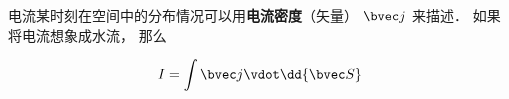 

电流某时刻在空间中的分布情况可以用\textbf{电流密度}（矢量） $\bvec j$ 来描述． 如果将电流想象成水流， 那么

\begin{equation}
I = \int \bvec j \vdot \dd{\bvec S}
\end{equation}

